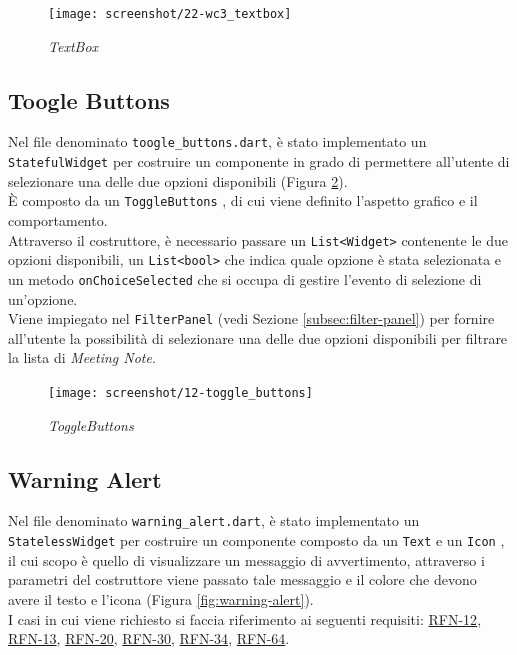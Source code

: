 \begin{figure}[!h] 
    \centering 
    \texttt{[image: screenshot/22-wc3\_textbox]} 
    \caption{\emph{TextBox}}
    \label{fig:text-box}
\end{figure}

\subsection{Toogle Buttons}
\label{subsec:toogle-buttons}

Nel file denominato \lstinline{toogle_buttons.dart}, è stato implementato un \lstinline{StatefulWidget} per costruire un componente in grado di permettere all'utente di selezionare una delle due opzioni disponibili (Figura \ref{fig:toggle-button}).\\
È composto da un \lstinline{ToggleButtons} \cite{site:toggle-buttons}, di cui viene definito l'aspetto grafico e il comportamento.\\
Attraverso il costruttore, è necessario passare un \lstinline{List<Widget>} contenente le due opzioni disponibili, un \lstinline{List<bool>} che indica quale opzione è stata selezionata e un metodo \lstinline{onChoiceSelected} che si occupa di gestire l'evento di selezione di un'opzione.\\
Viene impiegato nel \lstinline{FilterPanel} (vedi Sezione \ref{subsec:filter-panel}) per fornire all'utente la possibilità di selezionare una delle due opzioni disponibili per filtrare la lista di \emph{Meeting Note}.

\begin{figure}[!h] 
    \centering 
    \texttt{[image: screenshot/12-toggle\_buttons]} 
    \caption{\emph{ToggleButtons}}
    \label{fig:toggle-button}
\end{figure}

\clearpage

\subsection{Warning Alert}
\label{subsec:warning-alert}

Nel file denominato \lstinline{warning_alert.dart}, è stato implementato un \lstinline{StatelessWidget} per costruire un componente composto da un \lstinline{Text} \cite{site:text} e un \lstinline{Icon} \cite{site:icon}, il cui scopo è quello di visualizzare un messaggio di avvertimento, attraverso i parametri del costruttore viene passato tale messaggio e il colore che devono avere il testo e l'icona (Figura \ref{fig:warning-alert}).\\
I casi in cui viene richiesto si faccia riferimento ai seguenti requisiti: \hyperref[RFN-12]{RFN-12}, \hyperref[RFN-13]{RFN-13}, \hyperref[RFN-20]{RFN-20}, \hyperref[RFN-30]{RFN-30}, \hyperref[RFN-34]{RFN-34}, \hyperref[RFN-64]{RFN-64}.

